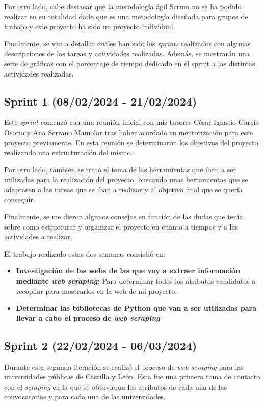 Por otro lado, cabe destacar que la metodología ágil Scrum no se ha podido realizar en su totalidad dado que es una metodología diseñada para grupos de trabajo y este proyecto ha sido un proyecto individual.

Finalmente, se van a detallar cuáles han sido los \textit{sprints} realizados con algunas descripciones de las tareas y actividades realizadas. Además, se mostrarán una serie de gráficas con el porcentaje de tiempo dedicado en el sprint a las distintas actividades realizadas.

\subsection{Sprint 1 (08/02/2024 -
21/02/2024)}

Este \textit{sprint} comenzó con una reunión inicial con mis tutores César Ignacio García Osorio y Ana Serrano Mamolar tras haber acordado su mentorización para este proyecto previamente. En esta reunión se determinaron los objetivos del proyecto realizando una estructuración del mismo.

Por otro lado, también se trató el tema de las herramientas que iban a ser utilizadas para la realización del proyecto, buscando unas herramientas que se adaptasen a las tareas que se iban a realizar y al objetivo final que se quería conseguir. 

Finalmente, se me dieron algunos consejos en función de las dudas que tenía sobre como estructurar y organizar el proyecto en cuanto a tiempos y a las actividades a realizar.


El trabajo realizado estas dos semanas consistió en:
\begin{itemize}
\item 
\textbf{Investigación de las webs de las que voy a extraer información mediante \textit{web scraping}: } Para determinar todos los atributos candidatos a recopilar para mostrarlos en la web de mi proyecto.
\item 
\textbf{Determinar las bibliotecas de Python que van a ser utilizadas para llevar a cabo el proceso de \textit{web scraping} }

\end{itemize}


\subsection{Sprint 2 (22/02/2024 -
06/03/2024)}
Durante esta segunda iteración se realizó el proceso de \textit{web scraping} para las universidades públicas de Castilla y León. Esta fue una primera toma de contacto con el \textit{scraping} en la que se obtuvieron los atributos de cada una de las convocatorias y para cada una de las universidades.

